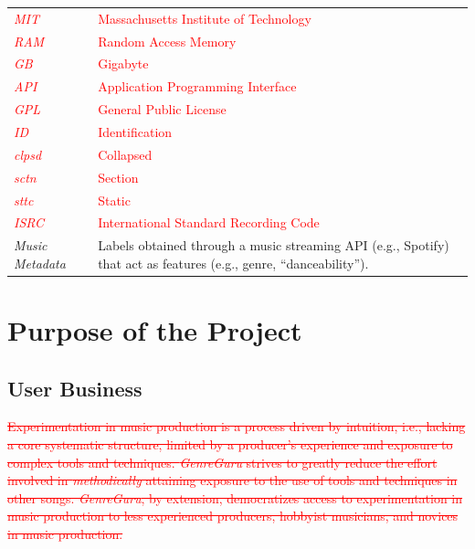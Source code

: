 \documentclass[12pt]{article}
\begin{document}
\begin{table}[H]
\begin{tabular}{p{3cm} p{10cm}}
  \textcolor{red}{\textit{MIT}} &
  \textcolor{red}{Massachusetts Institute of Technology} \\[6pt]

  \textcolor{red}{\textit{RAM}} &
  \textcolor{red}{Random Access Memory} \\[6pt]
  
  \textcolor{red}{\textit{GB}} &
  \textcolor{red}{Gigabyte} \\[6pt]

  \textcolor{red}{\textit{API}} &
  \textcolor{red}{Application Programming Interface} \\[6pt]

  \textcolor{red}{\textit{GPL}} &
  \textcolor{red}{General Public License} \\[6pt]

  \textcolor{red}{\textit{ID}} &
  \textcolor{red}{Identification} \\[6pt]

  \textcolor{red}{\textit{clpsd}} &
  \textcolor{red}{Collapsed} \\[6pt]

  \textcolor{red}{\textit{sctn}} &
 \textcolor{red}{ Section} \\[6pt]

  \textcolor{red}{\textit{sttc}} &
\textcolor{red}{  Static} \\[6pt]

  \textcolor{red}{\textit{ISRC}} &
  \textcolor{red}{International Standard Recording Code} \\[6pt]
  
  \textit{Music Metadata} &
  Labels obtained through a music streaming API (e.g., Spotify) that act as features (e.g., genre, “danceability”). \\
  \hline
  \end{tabular}
\end{table}

\section{Purpose of the Project}
\subsection{User Business}
\textcolor{red}{\sout{Experimentation in music production is a process driven by intuition, i.e., lacking a core systematic structure, limited by a producer's experience and exposure to complex tools and techniques. \emph{GenreGuru} strives to greatly reduce the effort involved in \emph{methodically} attaining exposure to the use of tools and techniques in other songs. \emph{GenreGuru}, by extension, democratizes access to experimentation in music production to less experienced producers, hobbyist musicians, and novices in music production.}}
\end{document}
